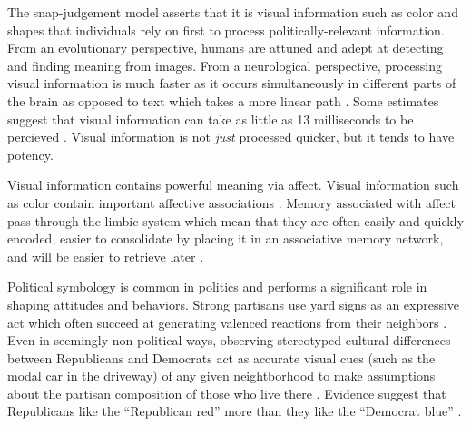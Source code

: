 \documentclass [12pt]{article}
\begin{document}
The snap-judgement model asserts that it is visual information such as color and shapes that individuals rely on first to process politically-relevant information. From an evolutionary perspective, humans are attuned and adept at detecting and finding meaning from images. From a neurological perspective, processing visual information is much faster as it occurs simultaneously in different parts of the brain as opposed to text which takes a more linear path \citep{vogel_et-al_1986_wp}. Some estimates suggest that visual information can take as little as 13 milliseconds to be percieved \citep{potter_et-al_2014_app}. Visual information is not \textit{just} processed quicker, but it tends to have potency.

Visual information contains powerful meaning via affect. Visual information such as color contain important affective associations \citep{cimbalo_et-al_1978_jgp}. Memory associated with affect pass through the limbic system which mean that they are often easily and quickly encoded, easier to consolidate by placing it in an associative memory network, and will be easier to retrieve later \citep{kensinger_fields_2022_ohhum}.

Political symbology is common in politics and performs a significant role in shaping attitudes and behaviors. Strong partisans use yard signs as an expressive act which often succeed at generating valenced reactions from their neighbors \citep{makse_et-al_2019_oup}. Even in seemingly non-political ways, observing stereotyped cultural differences between Republicans and Democrats act as accurate visual cues (such as the modal car in the driveway) of any given neightborhood to make assumptions about the partisan composition of those who live there \citep{hetherington_weiler_2018_hmh}. Evidence suggest that Republicans like the ``Republican red'' more than they like the ``Democrat blue'' \citep{schloss_palmer_2014_pbr}. 
\end{document}

